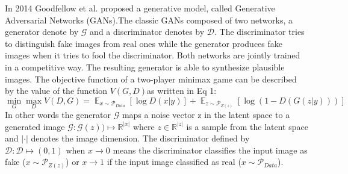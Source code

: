 \documentclass[letterpaper,12pt]{article}
\begin{document}
In 2014 Goodfellow et al.\cite{DBLP:conf/nips/GoodfellowPMXWOCB14} proposed a generative model, called Generative Adversarial Networks (GANs).The classic GANs composed of two networks, a generator denote by \(\mathcal{G}\)  and a discriminator denotes by \(\mathcal{D}\). The discriminator tries to distinguish fake images from real ones while the generator produces fake images when it tries to fool the discriminator. Both networks are jointly trained in a competitive way. The resulting generator is able to synthesize plausible images.
The objective function of a two-player minimax game can be described by the value of the function \(V(G,D)\)as written in Eq 1:
\begin{equation} \label{eq:ganeq1} %
\min _G \max _D V(D,G)=\mathop{{}\mathbb{E}}_{x\sim \mathcal{P}_{Data}}[\log D (x|y)] +  \mathop{{}\mathbb{E}}_{z\sim \mathcal{P}_{Z(z)}}[\log (1-D(G(z|y)))]
\end{equation}
In other words the generator \(\mathcal{G}\) maps a noise vector z in the latent space to a generated image \(\mathcal{G}:\mathcal{G}(z)) \mapsto \mathbb{R} ^{|x|}\) where \(z \in \mathbb{R}^{|z|}\) is a sample from the latent space and \(|\cdot|\) denotes the image dimension. The discriminator defined by \(\mathcal{D}:\mathcal{D}\mapsto(0,1)\) when \(x\to 0\) means the discriminator classifies the input image as fake (\(x\sim \mathcal{P}_{Z(z)}\)) or \(x\to 1\) if the input image classified as real (\(x\sim \mathcal{P}_{Data}\))\cite{DBLP:journals/corr/abs-1710-07035}. 
\end{document}
